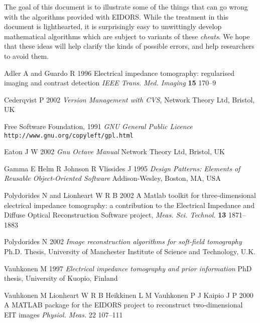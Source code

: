 \documentclass[12pt]{iopart}
\begin{document}
The goal of this document is to illustrate some of the things
that can go wrong with the algorithms provided with EIDORS.
While the treatment in this document is lighthearted, it
is surprisingly easy to unwittingly develop mathematical
algorithms which are subject to variants of these {\em cheats}.
We hope that these ideas will help clarify the kinds of
possible errors, and help researchers to avoid them.


\References %

\item[]
Adler A and Guardo R
1996
Electrical impedance tomography: regularised imaging and contrast detection 
\textit{IEEE Trans. Med. Imaging} \textbf{15} 170--9

\item[]
Cederqvist P 2002
{\it Version Management with CVS},
Network Theory Ltd, Bristol, UK

\item[]
Free Software Foundation, 1991
{\it GNU General Public Licence}
{\tt http://www.gnu.org/copyleft/gpl.html}

\item[]
Eaton J W 2002
{\it Gnu Octave Manual}
Network Theory Ltd, Bristol, UK

\item[]
Gamma E Helm R Johnson R Vlissides J 1995
{\it Design Patterns: Elements of Reusable Object-Oriented Software}
Addison-Wesley, Boston, MA, USA

\item[] 
Polydorides N and Lionheart W R B
2002
A Matlab toolkit for three-dimensional electrical impedance
tomography: a contribution to the Electrical Impedance and
Diffuse Optical Reconstruction Software project,
{\it Meas. Sci. Technol.} {\bf 13} 1871--1883 

\item[] 
Polydorides N 
2002
{\it Image reconstruction algorithms for soft-field tomography}
Ph.D. Thesis,
University of Manchester Institute of Science and Technology, U.K. 

\item[] 
Vauhkonen M 
1997
{\it Electrical impedance tomography and prior information}
PhD thesis, University of Kuopio, Finland 

\item[] 
Vauhkonen M
Lionheart W R B
Heikkinen L M
Vauhkonen P J
Kaipio J P 
2000
A MATLAB package for the EIDORS project to reconstruct
two-dimensional EIT images
{\it Physiol. Meas.} 22 107--111 


\endrefs
\end{document}
